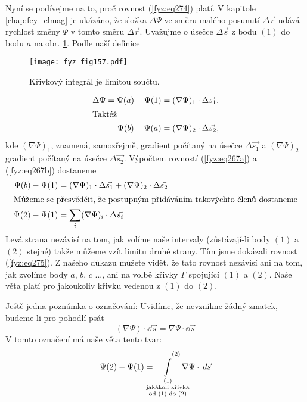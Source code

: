 {    Nyní se podívejme na to, proč rovnost (\ref{fyz:eq274}) platí. V kapitole   
    \ref{chap:fey_elmag} je ukázáno, že složka \(\Delta\Psi\) ve směru malého posunutí 
    \(\Delta\vec{r}\) udává rychlost změny \(\Psi\) v tomto směru \(\Delta\vec{r}\). Uvažujme o 
    úsečce \(\Delta\vec{s}\) z bodu \((1)\) do bodu \(a\) na obr. \ref{fyz:fig157}. Podle 
    naší definice
    
    \begin{figure}
      \centering
      \texttt{[image: fyz\_fig157.pdf]}
      \caption{Křivkový integrál je limitou součtu.}
      \label{fyz:fig157}
    \end{figure}
    
    \begin{align}
     \Delta\Psi = \Psi(a) - \Psi(1) 
       &= (\nabla\Psi)_1\cdot\Delta\vec{s_1}.         \label{fyz:eq267a}  \\
     \shortintertext{Taktéž}
     \Psi(b) - \Psi(a)
       &= (\nabla\Psi)_2\cdot\Delta\vec{s_2},         \label{fyz:eq267b}
    \end{align}
    kde \((\nabla\Psi)_1\), znamená, samozřejmě, gradient počítaný na úsečce \(\Delta\vec{s_1}\) a 
    \((\nabla\Psi)_2\) gradient počítaný na úsečce \(\Delta\vec{s_2}\). Výpočtem rovností 
    (\ref{fyz:eq267a}) a (\ref{fyz:eq267b}) dostaneme
    \begin{align}
     \Psi(b) - \Psi(1)              &= 
        (\nabla\Psi)_1\cdot\Delta\vec{s_1} + 
        (\nabla\Psi)_2\cdot\Delta\vec{s_2}               \label{fyz:eq268a} \\
     \shortintertext{Můžeme se přesvědčit, že postupným přidáváním takovýchto členů dostaneme}
     \Psi(2) - \Psi(1)              &= 
       \sum_i(\nabla\Psi)_i\cdot\Delta\vec{s_i}         \label{fyz:eq268b}
    \end{align}
    Levá strana nezávisí na tom, jak volíme naše intervaly (zů\-stá\-va\-jí-li body \((1)\) a 
    \((2)\) stejné) takže můžeme vzít limitu druhé strany. Tím jsme dokázali rovnost 
    (\ref{fyz:eq275}). Z našeho důkazu můžete vidět, že tato rovnost nezávisí ani na 
    tom, jak zvolíme body \(a\), \(b\), \(c\) ..., ani na volbě křivky \(\Gamma\) spojující \((1)\) 
    a \((2)\). Naše věta platí pro jakoukoliv křivku vedenou z \((1)\) do \((2)\).
    
    Ještě jedna poznámka o označování: Uvidíme, že nevznikne žádný zmatek, budeme-li pro pohodlí psát
    \begin{equation}\label{fyz:eq269}
     (\nabla\Psi)\cdot\dd{\vec{s}} = \nabla\Psi\cdot\dd{\vec{s}}
    \end{equation}     
    V tomto označení má naše věta tento tvar:
    \begin{equation}\label{fyz:eq273}
     \Psi(2)-\Psi(1) =  
       \limitint_{\mathclap{\substack{(1)\\\text{jakákoli křivka}\\\text{od (1) do 
       (2)}}}}^{\qquad(2)}
         \nabla\Psi\cdot\dd{\vec{s}}
    \end{equation}

}
